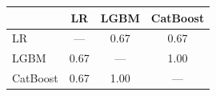 \begin{tabular}{l c c c}
\toprule
          & LR & LGBM & CatBoost \\
\midrule
LR         & --- & 0.67 & 0.67 \\
LGBM       & 0.67 & --- & 1.00 \\
CatBoost   & 0.67 & 1.00 & --- \\
\bottomrule
\end{tabular}
